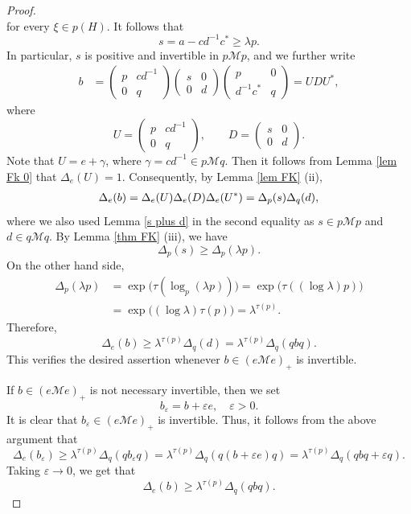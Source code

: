 \documentclass[11]{amsart}
\numberwithin{equation}{section}
\newcommand{\M}{\mathcal{M}}
\begin{document}
\begin{proof}
\[\]
for every $\xi\in p(H)$. 
	It follows that 
	\begin{equation}\label{eq:schur-s}
		s=a-cd^{-1}c^*\geq \lambda p.
	\end{equation}
	In particular, $s$ is positive and invertible in $p\mathcal Mp$,  and we further write 
	\begin{equation}\label{eq:b-LDU}
		\begin{split}
			b&=
			\begin{pmatrix}p&cd^{-1}\\0&q\end{pmatrix}
			\begin{pmatrix}s&0\\0&d\end{pmatrix}
			\begin{pmatrix}p&0\\d^{-1}c^*&q\end{pmatrix}
			=UDU^*,
		\end{split}
	\end{equation}
	where 
	\[U=	\begin{pmatrix}p&cd^{-1}\\0&q\end{pmatrix},\qquad D=	\begin{pmatrix}s&0\\0&d\end{pmatrix}.\]
	Note that $U=e+\gamma$, where $\gamma=cd^{-1}\in p\mathcal{M}q$. 
	Then it follows from Lemma \ref{lem Fk 0} that  $\Delta_e(U)=1$.  Consequently, by Lemma \ref{lem FK} (ii),
	\begin{align*}
		\Delta_e(b)
		=\Delta_e(U)\Delta_e(D)\Delta_e(U^*)\notag=\Delta_p(s)\Delta_q(d),
	\end{align*}
	where we also used Lemma \ref{s plus d} in the second equality as $s\in p\M p$ and $d\in q\M q$. 	By Lemma \ref{thm FK} (iii), we have
	\[
	\Delta_p(s) \geq \Delta_p(\lambda p).
	\]
	On the other hand side, 
	\begin{equation}\label{delta p}
	\begin{split}
		\Delta_p(\lambda p)
		&=\exp\bigl(\tau(\log_p(\lambda p))\bigr)
		=\exp\bigl(\tau((\log\lambda)p)\bigr)\\
		&=\exp\bigl((\log\lambda)\tau(p)\bigr)=\lambda^{\tau(p)}.
	\end{split}
	\end{equation}
Therefore,
\[
		\Delta_e(b)\geq \lambda^{\tau(p)} \Delta_q(d)=\lambda^{\tau(p)} \Delta_q(qbq).
\]
	This verifies the desired assertion whenever  $b\in(e\mathcal Me)_+$ is  invertible.
	
	If  $b\in(e\mathcal Me)_+$ is not necessary invertible, then we set 
	$$b_{\varepsilon}=b+\varepsilon e,\quad \varepsilon>0.$$
	It is clear that $b_{\varepsilon}\in(e\mathcal Me)_+$ is invertible. Thus, it follows from the above argument that
		\[
	\Delta_e(b_{\varepsilon})\geq\lambda^{\tau(p)}\Delta_q(qb_{\varepsilon}q)=\lambda^{\tau(p)}\Delta_q(q(b+\varepsilon e)q)=\lambda^{\tau(p)}\Delta_q(qbq+\varepsilon q).
	\]
	Taking $\varepsilon\to 0$, we get that 
		\[
	\Delta_e(b)\geq\lambda^{\tau(p)}\Delta_q(qbq ).
	\]
\end{proof}
\end{document}
